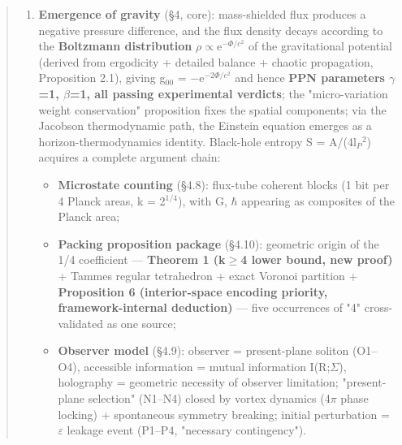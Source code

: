 \documentclass[12pt]{article}
\newcommand{\up}[1]{\ensuremath{^{#1}}}
\newcommand{\down}[1]{\ensuremath{_{#1}}}
\begin{document}
\begin{abstract}
\begin{enumerate}
\item \textbf{Emergence of gravity} (\S{}4, core): mass-shielded flux produces a negative pressure difference, and the flux density decays according to the \textbf{Boltzmann distribution} \ensuremath{\rho}\ensuremath{\propto}e\up{-\Phi{}/c^{2}} of the gravitational potential (derived from ergodicity + detailed balance + chaotic propagation, Proposition 2.1), giving g\down{00} = \ensuremath{-}e\up{-2\Phi{}/c^{2}} and hence \textbf{PPN parameters \ensuremath{\gamma}=1, \ensuremath{\beta}=1, all passing experimental verdicts}; the "micro-variation weight conservation" proposition fixes the spatial components; via the Jacobson thermodynamic path, the Einstein equation emerges as a horizon-thermodynamics identity. Black-hole entropy S = A/(4l\down{P}\up{2}) acquires a complete argument chain:
\begin{itemize}
\item \textbf{Microstate counting} (\S{}4.8): flux-tube coherent blocks (1 bit per 4 Planck areas, k = 2\up{1/4}), with G, \ensuremath{\hbar} appearing as composites of the Planck area;
\item \textbf{Packing proposition package} (\S{}4.10): geometric origin of the 1/4 coefficient --- \textbf{Theorem 1 (k\ensuremath{\geq}4 lower bound, new proof)} + Tammes regular tetrahedron + exact Voronoi partition + \textbf{Proposition 6 (interior-space encoding priority, framework-internal deduction)} --- five occurrences of "4" cross-validated as one source;
\item \textbf{Observer model} (\S{}4.9): observer = present-plane soliton (O1--O4), accessible information = mutual information I(R;\ensuremath{\Sigma}), holography = geometric necessity of observer limitation; "present-plane selection" (N1--N4) closed by vortex dynamics (4\ensuremath{\pi} phase locking) + spontaneous symmetry breaking; initial perturbation = \ensuremath{\varepsilon} leakage event (P1--P4, "necessary contingency").

\end{itemize}
\end{enumerate}
\end{abstract}
\end{document}
